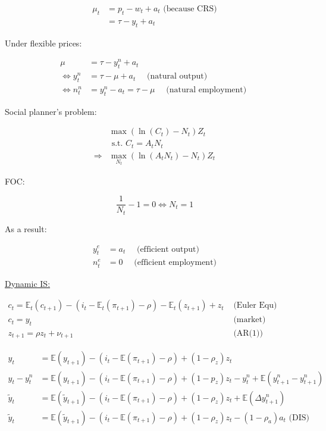 {\begin{enumerate}[label=(\alph*)]
{\begin{align*}
    \mu_{t}&=p_{t}-w_{t}+a_{t} \text{ (because CRS)} \\
    &=\tau-y_{t}+a_{t}
\end{align*}

Under flexible prices:

$$
\begin{aligned}
\mu &= \tau-y_{t}^{n}+a_{t} \\
\Leftrightarrow y_{t}^{n} &= \tau-\mu+a_{t} \quad \text { (natural output) } \\
\Leftrightarrow n_{t}^{n} &= y_{t}^{n}-a_{t}=\tau-\mu \quad \text { (natural employment) }
\end{aligned}
$$

Social planner's problem:

$$
\begin{aligned}
& \max \left(\ln \left(C_{t}\right)-N_{t}\right) Z_{t} \\
& \text { s.t. } C_{t}=A_{t} N_{t} \\
\Longrightarrow & \max_{N_t} \left(\ln \left(A_{t} N_{t}\right)-N_{t}\right) Z_{t}
\end{aligned} 
$$

FOC:

$$
\frac{1}{N_{t}}-1=0 \Leftrightarrow N_{t}=1
$$

As a result:

\begin{align*}
    y_{t}^{e} &= a_{t} \quad \text{ (efficient output)} \\
    n_{t}^{e} &= 0 \quad \text{ (efficient employment)}
\end{align*}
}
{
\item 
\underline{Dynamic IS:}

$\begin{array}{ll}c_{t}=\mathbb{E}_{t}\left(c_{t+1}\right)-\left(i_{t}-\mathbb{E}_{t}\left(\pi_{t+1}\right)-\rho\right)-\mathbb{E}_{t}\left(z_{t+1}\right)+z_{t} & \text { (Euler Equ) } \\ c_{t}=y_{t} & \text { (market) } \\ z_{t+1}=\rho z_{t}+\nu_{t+1} & \text { (AR(1)) } \end{array}$

\begin{align*}
    y_{t} &= \mathbb{E} \left( y_{t+1} \right) - \left(i_{t}-\mathbb{E}\left(\pi_{t+1}\right)-\rho\right)+\left(1-\rho_{z}\right) z_{t} \\
    y_{t}-y_{t}^{n} &= \mathbb{E} \left( y_{t+1} \right) - \left(i_{t}-\mathbb{E}\left(\pi_{t+1}\right)-\rho\right)+\left(1-p_{z}\right) z_{t}-y_{t}^{n}+\mathbb{E}\left(y_{t+1}^n-y_{t+1}^n\right) \\
    \tilde{y}_{t} &= \mathbb{E} \left( \tilde{y}_{t+1} \right) - \left( i_{t} - \mathbb{E} \left(\pi_{t+1}\right)-\rho \right)+\left(1-\rho_{z}\right) z_{t}+\mathbb{E}\left(\Delta y_{t+1}^{n}\right) \\
    \tilde{y}_{t} &= \mathbb{E} \left( \tilde{y}_{t+1} \right)-\left( i_{t}-\mathbb{E}\left(\pi_{t+1}\right)-\rho\right)+\left(1-\rho_{z}\right) z_{t}-\left(1-\rho_{a}\right) a_{t} \text{ (DIS)}
\end{align*}

}
\end{enumerate}}
